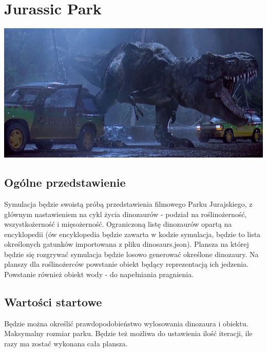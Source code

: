 

\pagestyle{empty}

\section{Jurassic Park}
\begin{center}
    \includegraphics[width=0.7\columnwidth]{jurassic.png}
\end{center}
\subsection{Ogólne przedstawienie}
Symulacja będzie swoistą próbą przedstawienia filmowego Parku Jurajskiego, z głównym nastawieniem na cykl życia dinozaurów - podział na roślinożerność, wszystkożerność i mięsożerność. Ograniczoną listę dinozaurów opartą na encyklopedii (ów encyklopedia będzie zawarta w kodzie symulacja, będzie to lista określonych gatunków importowana z pliku dinosaurs.json). Plansza na której będzie się rozgrywać symulacja będzie losowo generować określone dinozaury. Na planszy dla roślinożerców powstanie obiekt będący reprezentacją ich jedzenia. Powstanie również obiekt wody - do napełniania pragnienia.
\subsection{Wartości startowe}
Będzie można określić prawdopodobieństwo wylosowania dinozaura i obiektu. Maksymalny rozmiar parku. Będzie też możliwa do ustawienia ilość iteracji, ile razy ma zostać wykonana cała plansza.
